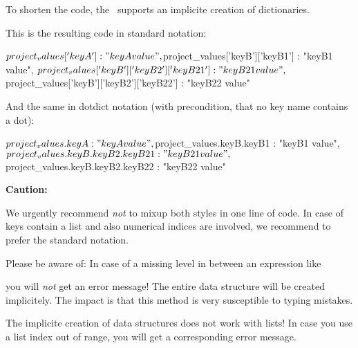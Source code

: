 To shorten the code, the \pkg\ supports an implicite creation of dictionaries.

This is the resulting code in standard notation:

\begin{pythoncode}
{
   ${project_values}['keyA'] : "keyA value",
   ${project_values}['keyB']['keyB1'] : "keyB1 value",
   ${project_values}['keyB']['keyB2']['keyB21'] : "keyB21 value",
   ${project_values}['keyB']['keyB2']['keyB22'] : "keyB22 value"
}
\end{pythoncode}

\vspace{2ex}

And the same in dotdict notation (with precondition, that no key name contains a dot):

\begin{pythoncode}
{
   ${project_values.keyA} : "keyA value",
   ${project_values.keyB.keyB1} : "keyB1 value",
   ${project_values.keyB.keyB2.keyB21} : "keyB21 value",
   ${project_values.keyB.keyB2.keyB22} : "keyB22 value"
}
\end{pythoncode}

\vspace{2ex}

\textbf{Caution:}

We urgently recommend \textit{not} to mixup both styles in one line of code. In case of keys contain a list and also numerical indices are involved,
we recommend to prefer the standard notation. 

Please be aware of: In case of a missing level in between an expression like 


you will \textit{not} get an error message! The entire data structure will be created implicitely. The impact is that this method
is very susceptible to typing mistakes.

The implicite creation of data structures does not work with lists! In case you use a list index out of range, you will get
a corresponding error message.


